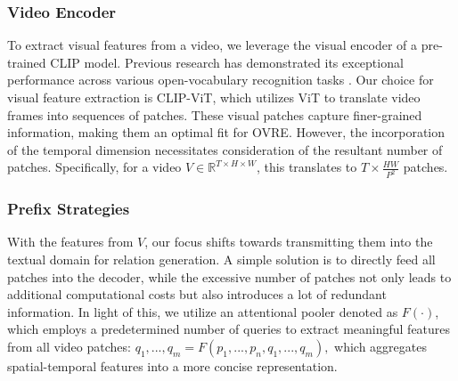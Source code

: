 \documentclass[letterpaper]{article}
\begin{document}
\subsubsection{Video Encoder}
To extract visual features from a video, we leverage the visual encoder of a pre-trained CLIP \cite{radford2021learning} model.
Previous research has demonstrated its exceptional performance across various open-vocabulary recognition tasks \cite{ni2022expanding,tang2021clip4caption,luo2022clip4clip}.
Our choice for visual feature extraction is CLIP-ViT, which utilizes ViT\cite{dosovitskiy2020image} to translate video frames into sequences of patches. These visual patches capture finer-grained information, making them an optimal fit for OVRE. However, the incorporation of the temporal dimension necessitates consideration of the resultant number of patches. Specifically, for a video $V\in \mathbb{R}^{T\times H\times W}$, this translates to $T\times\frac{HW}{P^{2}}$ patches.
\subsubsection{Prefix Strategies}
With the features from $V$, our focus shifts towards transmitting them into the textual domain for relation generation. A simple solution is to directly feed all patches into the decoder, while the excessive number of patches not only leads to additional computational costs but also introduces a lot of redundant information.
In light of this, we utilize an attentional pooler denoted as $F(\cdot)$, which employs a predetermined number of queries to extract meaningful features from all video patches:
$
q_1,...,q_m=F(p_1,...,p_n,q_1,...,q_m),
$
which aggregates spatial-temporal features into a more concise representation.
\end{document}
